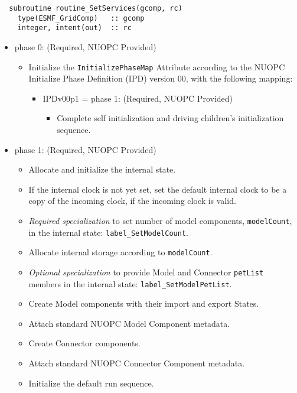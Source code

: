\begin{verbatim}  subroutine routine_SetServices(gcomp, rc)
    type(ESMF_GridComp)   :: gcomp
    integer, intent(out)  :: rc
\end{verbatim}

\begin{itemize}
\item phase 0: ({\sc Required, NUOPC Provided})
  \begin{itemize}
  \item Initialize the {\tt InitializePhaseMap} Attribute according to the NUOPC Initialize Phase Definition (IPD) version 00, with the following mapping:
    \begin{itemize}
    \item IPDv00p1 = phase 1: ({\sc Required, NUOPC Provided})
      \begin{itemize}
      \item Complete self initialization and driving children's initialization sequence.
      \end{itemize}
    \end{itemize}  
  \end{itemize}  
\item phase 1: ({\sc Required, NUOPC Provided})
  \begin{itemize}
  \item Allocate and initialize the internal state.
  \item If the internal clock is not yet set, set the default internal clock to be a copy of the incoming clock, if the incoming clock is valid.
  \item {\it Required specialization} to set number of model components, {\tt modelCount}, in the internal state: {\tt label\_SetModelCount}.
  \item Allocate internal storage according to {\tt modelCount}.
  \item {\it Optional specialization} to provide Model and Connector {\tt petList} members in the internal state: {\tt label\_SetModelPetList}.
  \item Create Model components with their import and export States.
  \item Attach standard NUOPC Model Component metadata.
  \item Create Connector components.
  \item Attach standard NUOPC Connector Component metadata.
  \item Initialize the default run sequence.

\end{itemize}
\end{itemize}
